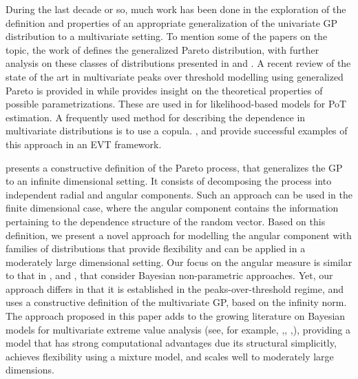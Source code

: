 During the last decade or so, much work has been done in the exploration of the 
    definition and properties of an appropriate generalization of the univariate 
    GP distribution to a multivariate setting.  To mention some of the papers on 
    the topic, the work of \citep{rootzen2006} defines the generalized Pareto 
    distribution, with further analysis on these classes of distributions 
    presented in \cite{falk2008} and \cite{michel2008}.  A recent review of the 
    state of the art in multivariate peaks over threshold modelling using 
    generalized Pareto is provided in \cite{rootzen2018} while \cite{RoSeWa2018a} 
    provides insight on the theoretical properties of possible parametrizations. 
    These are used in \cite{KiRoSeWa2019} for likelihood-based models for PoT 
    estimation. A frequently used method for describing the dependence in 
    multivariate distributions is to use a copula. \cite{renard2007}, and 
    \cite{falk2019} provide successful examples of this approach in an EVT 
    framework. 
    
    \cite{ferreira2014} presents a constructive definition of the 
    Pareto process, that generalizes the GP to an infinite dimensional setting. It 
    consists of decomposing the process into independent radial and angular 
    components. Such an approach can be used in the finite dimensional case, where 
    the angular component contains the information pertaining to the dependence 
    structure of the random vector. Based on this definition, we present a novel 
    approach for modelling  the angular component with families of distributions 
    that provide flexibility and can be applied in a moderately large dimensional 
    setting.  Our focus on the angular measure is similar to that in \cite{boldi2007},
    \cite{SaNa2014} and \cite{HaCaCh2017}, that consider Bayesian non-parametric 
    approaches. Yet, our approach differs in that it is established in the 
    peaks-over-threshold regime, and uses a constructive definition of the 
    multivariate GP, based on the infinity norm. The approach proposed in this paper
    adds to the growing literature on Bayesian models for multivariate extreme
    value analysis (see, for example, \cite{boldi2007},\cite{guillotte2011},
    \cite{SaNa2014},\cite{hanson2017}), providing a model that has strong computational
    advantages due its structural simplicitly, achieves flexibility using 
    a mixture model, and scales well to moderately large dimensions.
  
